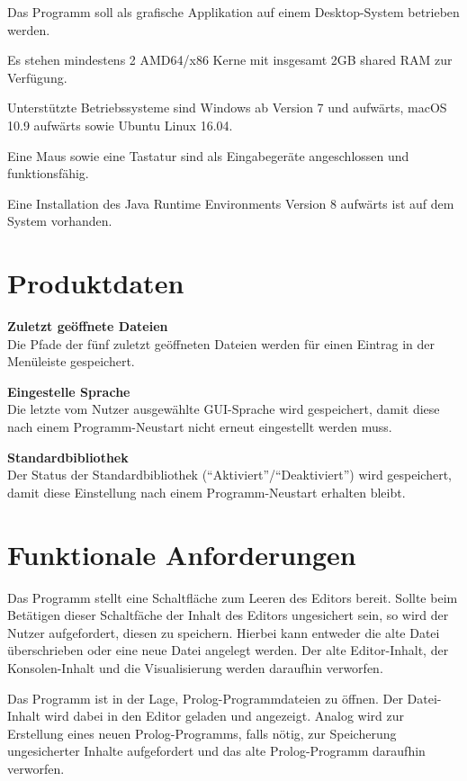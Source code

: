 \documentclass[parskip=full,11pt,twoside]{scrartcl}
\begin{document}
Das Programm soll als grafische Applikation auf einem Desktop-System betrieben werden.

Es stehen mindestens 2 AMD64/x86 Kerne mit insgesamt 2GB shared RAM zur Verfügung.

Unterstützte Betriebssysteme sind Windows ab Version 7 und aufwärts, macOS 10.9 aufwärts sowie Ubuntu Linux 16.04.

Eine Maus sowie eine Tastatur sind als Eingabegeräte angeschlossen und funktionsfähig.

Eine Installation des Java Runtime Environments Version 8 aufwärts ist auf dem System vorhanden.

\section{Produktdaten}

\textbf{Zuletzt geöffnete Dateien} \\
Die Pfade der fünf zuletzt geöffneten Dateien werden für einen Eintrag in der Menüleiste gespeichert.

\textbf{Eingestelle Sprache} \\
Die letzte vom Nutzer ausgewählte GUI-Sprache wird gespeichert, damit diese nach einem Programm-Neustart nicht erneut eingestellt werden muss.

\textbf{Standardbibliothek} \\
Der Status der Standardbibliothek (\enquote{Aktiviert}/\enquote{Deaktiviert}) wird gespeichert, damit diese Einstellung nach einem Programm-Neustart erhalten bleibt.

\section{Funktionale Anforderungen}


Das Programm stellt eine Schaltfläche zum Leeren des Editors bereit. Sollte beim Betätigen dieser Schaltfäche der Inhalt des Editors ungesichert sein, so wird der Nutzer aufgefordert, diesen zu speichern. Hierbei kann entweder die alte Datei überschrieben oder eine neue Datei angelegt werden. Der alte Editor-Inhalt, der Konsolen-Inhalt und die Visualisierung werden daraufhin verworfen.


Das Programm ist in der Lage, Prolog-Programmdateien zu öffnen. Der Datei-Inhalt wird dabei in den Editor geladen und angezeigt. Analog wird zur Erstellung eines neuen Prolog-Programms, falls nötig, zur Speicherung ungesicherter Inhalte aufgefordert und das alte Prolog-Programm daraufhin verworfen.
\end{document}

